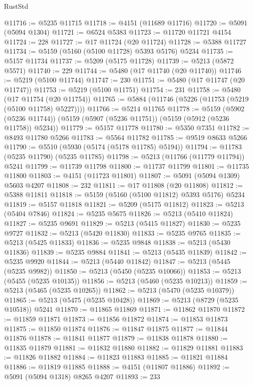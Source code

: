 \begin{lexlean}{RustStd}
\begin{coremodule}
@11716 := @5235 @11715
@11718 := @4151 (@11689 @11716)
@11720 := @5091 (@5094 @1304)
@11721 := @6524 @5383
@11723 := @11720 @11721 @4154
@11724 := 228
@11727 := @17 @11724 (@20 @11724)
@11728 := @5388 @11727
@11734 := @5159 (@5160 (@5100 @11728) @5393 @5176) @5234
@11735 := @5157 @11734
@11737 := @5209 (@5175 @11728)
@11739 := @5213 (@5872 @5571)
@11740 := 229
@11744 := @5480 (@17 @11740 (@20 @11740))
@11746 := @5219 (@5100 @11744)
@11747 := 230
@11751 := @5480 (@17 @11747 (@20 @11747))
@11753 := @5219 (@5100 @11751)
@11754 := 231
@11758 := @5480 (@17 @11754 (@20 @11754))
@11765 := @5884 (@11746 (@5226 (@11753 (@5219 (@5100 @11758) @5227))))
@11766 := @5214 @11765
@11778 := @5159
    (@5902 (@5236 @11744))
    (@5159 (@5907 (@5236 @11751)) (@5159 (@5912 (@5236 @11758)) @5234))
@11779 := @5157 @11778
@11780 := @5350 @7351
@11782 := @8493 @11780 @5266
@11783 := @5564 @11782
@11785 := @9519 @8633 @5266
@11790 := @5510 (@5930 (@5174 (@5178 @11785) @5194))
@11794 := @11783 (@5235 @11790) (@5235 @11785)
@11798 := @5213 (@11766 (@11779 @11794)) @5241
@11799 := @11739 @11798
@11800 := @11737 @11799
@11801 := @11735 @11800
@11803 := @4151 (@11723 @11801)
@11807 := @5091 (@5094 @1309) @5603 @4207
@11808 := 232
@11811 := @17 @11808 (@20 @11808)
@11812 := @5388 @11811
@11818 := @5159 (@5160 (@5100 @11812) @5393 @5176) @5234
@11819 := @5157 @11818
@11821 := @5209 (@5175 @11812)
@11823 := @5213 (@5404 @7846)
@11824 := @5235 @5675
@11826 := @5213 (@5410 @11824)
@11827 := @5235 @9691
@11829 := @5213 (@5415 @11827)
@11830 := @5235 @9727
@11832 := @5213 (@5420 @11830)
@11833 := @5235 @9765
@11835 := @5213 (@5425 @11833)
@11836 := @5235 @9848
@11838 := @5213 (@5430 @11836)
@11839 := @5235 @9884
@11841 := @5213 (@5435 @11839)
@11842 := @5235 @9920
@11844 := @5213 (@5440 @11842)
@11847 := @5213 (@5445 (@5235 @9982))
@11850 := @5213 (@5450 (@5235 @10066))
@11853 := @5213 (@5455 (@5235 @10135))
@11856 := @5213 (@5460 (@5235 @10213))
@11859 := @5213 (@5465 (@5235 @10265))
@11862 := @5213 (@5470 (@5235 @10379))
@11865 := @5213 (@5475 (@5235 @10428))
@11869 := @5213 (@8729 (@5235 @10518)) @5241
@11870 := @11865 @11869
@11871 := @11862 @11870
@11872 := @11859 @11871
@11873 := @11856 @11872
@11874 := @11853 @11873
@11875 := @11850 @11874
@11876 := @11847 @11875
@11877 := @11844 @11876
@11878 := @11841 @11877
@11879 := @11838 @11878
@11880 := @11835 @11879
@11881 := @11832 @11880
@11882 := @11829 @11881
@11883 := @11826 @11882
@11884 := @11823 @11883
@11885 := @11821 @11884
@11886 := @11819 @11885
@11888 := @4151 (@11807 @11886)
@11892 := @5091 (@5094 @1318) @8265 @4207
@11893 := 233

\end{coremodule}
\end{lexlean}
